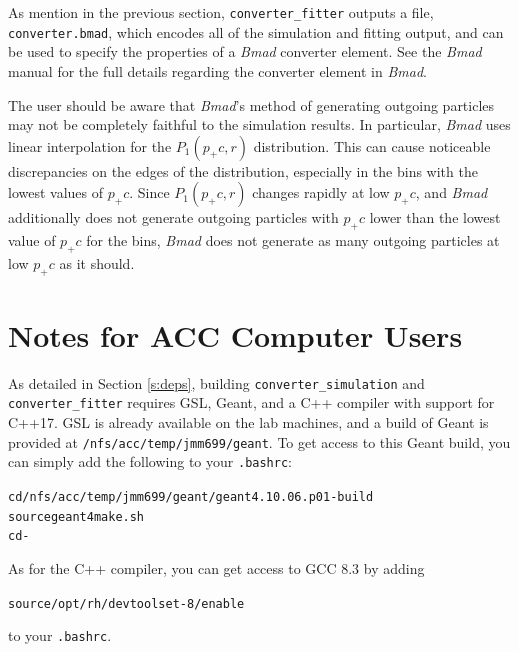 \documentclass[12pt]{article}
\newcommand{\exes}{\texttt{converter\_simulation}\xspace}
\newcommand{\exef}{\texttt{converter\_fitter}\xspace}
\newcommand{\bmad}{\textit{Bmad}\xspace}
\newenvironment{example}
  {\vspace{-2.5ex} \begin{alltt}}
  {\end{alltt} \vspace{-2.2ex}}
\begin{document}
As mention in the previous section, \exef outputs a file, \texttt{converter.bmad}, which encodes all
of the simulation and fitting output, and can be used to specify the properties of a \bmad converter
element.  See the \bmad manual for the full details regarding the converter element in \bmad.

The user should be aware that \bmad's method of generating outgoing particles may not be completely
faithful to the simulation results.  In particular, \bmad uses linear interpolation for the
$P_1(p_+c, r)$ distribution.  This can cause noticeable discrepancies on the edges of the
distribution, especially in the bins with the lowest values of $p_+ c$.  Since $P_1(p_+c, r)$
changes rapidly at low $p_+ c$, and \bmad additionally does not generate outgoing particles with
$p_+ c$ lower than the lowest value of $p_+ c$ for the bins, \bmad does not generate as many
outgoing particles at low $p_+ c$ as it should.

\appendix

\newpage
\section{Notes for ACC Computer Users}

As detailed in Section \ref{s:deps}, building \exes and \exef requires GSL, Geant, and a C++
compiler with support for C++17.  GSL is already available on the lab machines, and a build of Geant
is provided at \texttt{/nfs/acc/temp/jmm699/geant}.  To get access to this Geant build, you can
simply add the following to your \texttt{.bashrc}:
\begin{example}
  cd /nfs/acc/temp/jmm699/geant/geant4.10.06.p01-build 
  source geant4make.sh 
  cd -
\end{example}
As for the C++ compiler, you can get access to GCC 8.3 by adding
\begin{example}
  source /opt/rh/devtoolset-8/enable
\end{example}
to your \texttt{.bashrc}.

\printbibliography
\end{document}
